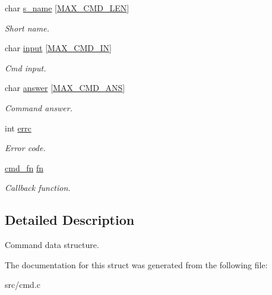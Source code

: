\begin{DoxyCompactItemize}
\mbox{\label{struct__Cmd_ac7a8c09e258cb2b2f63d179943616d08}} 
char \hyperlink{struct__Cmd_ac7a8c09e258cb2b2f63d179943616d08}{s\+\_\+name} \mbox{[}\hyperlink{cmd_8h_a1eb73c104b484cf18752169509cebfe2}{M\+A\+X\+\_\+\+C\+M\+D\+\_\+\+L\+EN}\mbox{]}
\begin{DoxyCompactList}\small\item\em Short name. \end{DoxyCompactList}\item 
\mbox{\label{struct__Cmd_a3d023ded28ab2b9ec8daae3ebf1a3759}} 
char \hyperlink{struct__Cmd_a3d023ded28ab2b9ec8daae3ebf1a3759}{input} \mbox{[}\hyperlink{cmd_8h_a536329c6bdf286710c20c6dd9a0750cc}{M\+A\+X\+\_\+\+C\+M\+D\+\_\+\+IN}\mbox{]}
\begin{DoxyCompactList}\small\item\em Cmd input. \end{DoxyCompactList}\item 
\mbox{\label{struct__Cmd_a143c62700ed611e1ff0d70611c76fa55}} 
char \hyperlink{struct__Cmd_a143c62700ed611e1ff0d70611c76fa55}{answer} \mbox{[}\hyperlink{cmd_8h_ab972c58772002197942552cc47b6b5cd}{M\+A\+X\+\_\+\+C\+M\+D\+\_\+\+A\+NS}\mbox{]}
\begin{DoxyCompactList}\small\item\em Command answer. \end{DoxyCompactList}\item 
\mbox{\label{struct__Cmd_a4f3acf8cfdc67548121c1989765cbbcf}} 
int \hyperlink{struct__Cmd_a4f3acf8cfdc67548121c1989765cbbcf}{errc}
\begin{DoxyCompactList}\small\item\em Error code. \end{DoxyCompactList}\item 
\mbox{\label{struct__Cmd_abfca5a0889206135702ed3e398079bad}} 
\hyperlink{cmd_8h_a78d7a8bd781b5514e6dd7e1253bb1907}{cmd\+\_\+fn} \hyperlink{struct__Cmd_abfca5a0889206135702ed3e398079bad}{fn}
\begin{DoxyCompactList}\small\item\em Callback function. \end{DoxyCompactList}\end{DoxyCompactItemize}


\subsection{Detailed Description}
Command data structure. 

The documentation for this struct was generated from the following file\+:\begin{DoxyCompactItemize}
\item 
src/cmd.\+c\end{DoxyCompactItemize}
